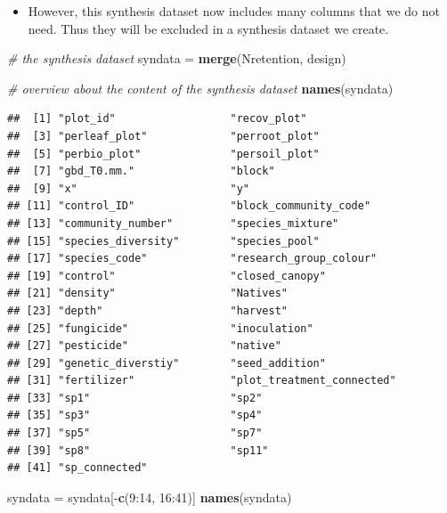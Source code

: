 \documentclass[]{article}
\newenvironment{Shaded}{}{}
\newcommand{\KeywordTok}[1]{\textcolor[rgb]{0.00,0.44,0.13}{\textbf{{#1}}}}
\newcommand{\DecValTok}[1]{\textcolor[rgb]{0.25,0.63,0.44}{{#1}}}
\newcommand{\CommentTok}[1]{\textcolor[rgb]{0.38,0.63,0.69}{\textit{{#1}}}}
\newcommand{\NormalTok}[1]{{#1}}
\begin{document}
\begin{itemize}
\itemsep1pt\parskip0pt
\item
  However, this synthesis dataset now includes many columns that we do
  not need. Thus they will be excluded in a synthesis dataset we create.
\end{itemize}

\begin{Shaded}
\begin{Highlighting}[]
\CommentTok{# the synthesis dataset}
\NormalTok{syndata = }\KeywordTok{merge}\NormalTok{(Nretention, design)}

\CommentTok{# overview about the content of the synthesis dataset}
\KeywordTok{names}\NormalTok{(syndata)}
\end{Highlighting}
\end{Shaded}

\begin{verbatim}
##  [1] "plot_id"                  "recov_plot"              
##  [3] "perleaf_plot"             "perroot_plot"            
##  [5] "perbio_plot"              "persoil_plot"            
##  [7] "gbd_T0.mm."               "block"                   
##  [9] "x"                        "y"                       
## [11] "control_ID"               "block_community_code"    
## [13] "community_number"         "species_mixture"         
## [15] "species_diversity"        "species_pool"            
## [17] "species_code"             "research_group_colour"   
## [19] "control"                  "closed_canopy"           
## [21] "density"                  "Natives"                 
## [23] "depth"                    "harvest"                 
## [25] "fungicide"                "inoculation"             
## [27] "pesticide"                "native"                  
## [29] "genetic_diverstiy"        "seed_addition"           
## [31] "fertilizer"               "plot_treatment_connected"
## [33] "sp1"                      "sp2"                     
## [35] "sp3"                      "sp4"                     
## [37] "sp5"                      "sp7"                     
## [39] "sp8"                      "sp11"                    
## [41] "sp_connected"
\end{verbatim}

\begin{Shaded}
\begin{Highlighting}[]
\NormalTok{syndata = syndata[-}\KeywordTok{c}\NormalTok{(}\DecValTok{9}\NormalTok{:}\DecValTok{14}\NormalTok{, }\DecValTok{16}\NormalTok{:}\DecValTok{41}\NormalTok{)]}
\KeywordTok{names}\NormalTok{(syndata)}
\end{Highlighting}
\end{Shaded}
\end{document}
